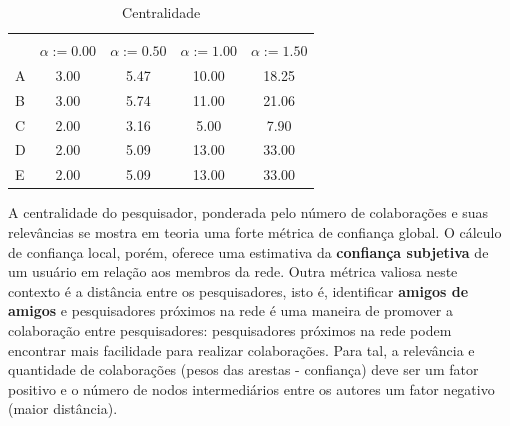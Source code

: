 \documentclass[12pt]{article}
\begin{document}
{\tiny
  \begin{table}[ht]
    \caption{Centralidade}
    \label{tab:centrality}
    \centering
    \begin{tabular}{|lcccc|}
      \hline
      \rowcolor[HTML]{343434} 
      \multicolumn{1}{|c}{\cellcolor[HTML]{343434}{\color[HTML]{FFFFFF} }}                       & \multicolumn{4}{c|}{\cellcolor[HTML]{343434}{\color[HTML]{FFFFFF} $C_D ^{w \alpha} (i)$}}                                              \\
      \rowcolor[HTML]{656565} 
      \multicolumn{1}{|c}{\multirow{-2}{*}{\cellcolor[HTML]{343434}{\color[HTML]{FFFFFF} Nodo}}} & {\color[HTML]{FFFFFF} $\alpha := 0.00$} & {\color[HTML]{FFFFFF} $\alpha := 0.50$} & {\color[HTML]{FFFFFF} $\alpha := 1.00$} & {\color[HTML]{FFFFFF} $\alpha := 1.50$} \\
      \multicolumn{1}{|l|}{A}                                                                    & 3.00                        & 5.47                        & 10.00                       & 18.25                       \\
      \multicolumn{1}{|l|}{B}                                                                    & 3.00                        & 5.74                        & 11.00                       & 21.06                       \\
      \multicolumn{1}{|l|}{C}                                                                    & 2.00                        & 3.16                        & 5.00                        & 7.90                        \\
      \multicolumn{1}{|l|}{D}                                                                    & 2.00                        & 5.09                        & 13.00                       & 33.00                       \\
      \multicolumn{1}{|l|}{E}                                                                    & 2.00                        & 5.09                        & 13.00                       & 33.00                       \\ \hline
    \end{tabular}
  \end{table}  
  }


A centralidade do pesquisador, ponderada pelo número de colaborações e suas relevâncias se mostra em teoria uma forte métrica de confiança global. O cálculo de confiança local, porém, oferece uma estimativa da \textbf{confiança subjetiva} de um usuário em relação aos membros da rede. Outra métrica valiosa neste contexto é a distância entre os pesquisadores, isto é, identificar \textbf{amigos de amigos} e pesquisadores próximos na rede é uma maneira de promover a colaboração entre pesquisadores: pesquisadores próximos na rede podem encontrar mais facilidade para realizar colaborações. Para tal, a relevância e quantidade de colaborações (pesos das arestas - confiança) deve ser um fator positivo e o número de nodos intermediários entre os autores um fator negativo (maior distância).
\end{document}
